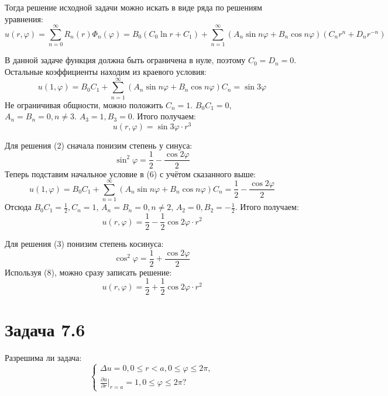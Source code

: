 \documentclass[11pt]{article}
\begin{document}
Тогда решение исходной задачи можно искать в виде ряда по решениям уравнения:
\begin{equation}
u(r, \varphi) = \sum_{n = 0}^{\infty}R_n(r)\Phi_n(\varphi) = B_0(C_0\ln r + C_1) +
\sum_{n = 1}^{\infty}(A_n\sin n\varphi + B_n\cos n\varphi)\left(C_nr^n + D_nr^{-n}\right)
\end{equation}

В данной задаче функция должна быть ограничена в нуле, поэтому $C_0 = D_n = 0$. Остальные
коэффициенты находим из краевого условия:
\begin{equation*}
u(1, \varphi) = B_0C_1 + \sum_{n = 1}^{\infty}(A_n\sin n\varphi + B_n\cos n\varphi)C_n = \sin3\varphi
\end{equation*}
Не ограничивая общности, можно положить $C_n = 1$. $B_0C_1 = 0$, $A_n = B_n = 0, n \neq 3$.
$A_3 = 1, B_3 = 0$. Итого получаем:
\begin{equation}
u(r, \varphi) = \sin3\varphi \cdot r^3
\end{equation}

Для решения (2) сначала понизим степень у синуса:
\begin{equation*}
\sin^2\varphi = \frac12 - \frac{\cos2\varphi}2
\end{equation*}
Теперь подставим начальное условие в (6) с учётом сказанного выше:
\begin{equation*}
u(1, \varphi) = B_0C_1 + \sum_{n = 1}^{\infty}(A_n\sin n\varphi + B_n\cos n\varphi)C_n = \frac12 - \frac{\cos2\varphi}2
\end{equation*}
Отсюда $B_0C_1 = \frac12, C_n = 1$, $A_n = B_n = 0, n \neq 2$, $A_2 = 0, B_2 = -\frac12$. Итого получаем:
\begin{equation}
u(r, \varphi) = \frac12 - \frac12\cos2\varphi\cdot r^2
\end{equation}

Для решения (3) понизим степень косинуса:
\begin{equation*}
\cos^2\varphi = \frac12 + \frac{\cos2\varphi}2
\end{equation*}
Используя (8), можно сразу записать решение:
\begin{equation}
u(r, \varphi) = \frac12 + \frac12\cos2\varphi\cdot r^2
\end{equation}
\section{Задача 7.6}
\label{sec:org62717c2}
Разрешима ли задача:
\begin{equation}
\begin{cases}
\Delta u = 0, 0 \leq r < a, 0 \leq \varphi \leq 2\pi, \\
\frac{\partial u}{\partial r}\bigg|_{r = a} = 1, 0 \leq \varphi \leq 2\pi?
\end{cases}
\end{equation}
\end{document}
